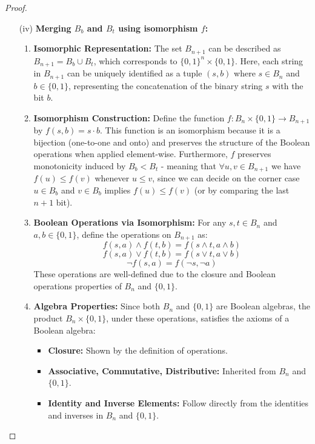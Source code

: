 \begin{proof}
\begin{enumerate}
\begin{enumerate}[label=(\roman*)]
        \item[(iv)] \textbf{Merging \(B_b\) and \(B_t\) using isomorphism $f$:}
        \begin{enumerate}
            \item \textbf{Isomorphic Representation:} The set \(B_{n+1}\) can be described as \(B_{n+1} = B_b \cup B_t\), which corresponds to \(\{0,1\}^n \times \{0,1\}\). Here, each string in \(B_{n+1}\) can be uniquely identified as a tuple \((s, b)\) where \(s \in B_n\) and \(b \in \{0,1\}\), representing the concatenation of the binary string \(s\) with the bit \(b\).

            \item \textbf{Isomorphism Construction:} Define the function \(f: B_n \times \{0,1\} \to B_{n+1}\) by \(f(s, b) = s \cdot b\). This function is an isomorphism because it is a bijection (one-to-one and onto) and preserves the structure of the Boolean operations when applied element-wise. Furthermore, $f$ preserves monotonicity induced by $B_b < B_t$ - meaning that $\forall u,v \in B_{n+1}$ we have $f(u) \leq f(v)$ whenever $u \leq v$, since we can decide on the corner case $u \in B_b$ and $v \in B_b$ implies $f(u) \leq f(v)$ (or by comparing the last $n+1$ bit).

            \item \textbf{Boolean Operations via Isomorphism:} For any \(s, t \in B_n\) and \(a, b \in \{0,1\}\), define the operations on \(B_{n+1}\) as:
                \[
                f(s, a) \land f(t, b) = f(s \land t, a \land b)
                \]
                \[
                f(s, a) \lor f(t, b) = f(s \lor t, a \lor b)
                \]
                \[
                \neg f(s, a) = f(\neg s, \neg a)
                \]
                These operations are well-defined due to the closure and Boolean operations properties of \(B_n\) and \(\{0,1\}\).

            \item \textbf{Algebra Properties:} Since both \(B_n\) and \(\{0,1\}\) are Boolean algebras, the product \(B_n \times \{0,1\}\), under these operations, satisfies the axioms of a Boolean algebra:
                \begin{itemize}
                    \item \textbf{Closure:} Shown by the definition of operations.
                    \item \textbf{Associative, Commutative, Distributive:} Inherited from \(B_n\) and \(\{0,1\}\).
                    \item \textbf{Identity and Inverse Elements:} Follow directly from the identities and inverses in \(B_n\) and \(\{0,1\}\).
                \end{itemize}
        \end{enumerate}


\end{enumerate}
\end{enumerate}
\end{proof}
